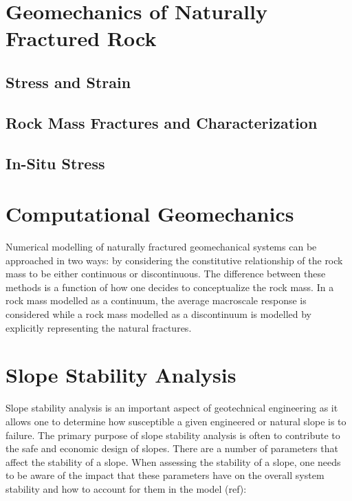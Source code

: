 \section{Geomechanics of Naturally Fractured Rock}




\subsection{Stress and Strain}


\subsection{}

\subsection{Rock Mass Fractures and Characterization}


\subsection{In-Situ Stress}

\section{Computational Geomechanics}

Numerical modelling of naturally fractured geomechanical systems can be approached in two ways: by considering the constitutive relationship of the rock mass to be either continuous or discontinuous. The difference between these methods is a function of how one decides to conceptualize the rock mass. In a rock mass modelled as a continuum, the average macroscale response is considered while a rock mass modelled as a discontinuum is modelled by explicitly representing the natural fractures. 

\section{Slope Stability Analysis}
Slope stability analysis is an important aspect of geotechnical engineering as it allows one to determine how susceptible a given engineered or natural slope is to failure. The primary purpose of slope stability analysis is often to contribute to the safe and economic design of slopes. There are a number of parameters that affect the stability of a slope. When assessing the stability of a slope, one needs to be aware of the impact that these parameters have on the overall system stability and how to account for them in the model (ref):

